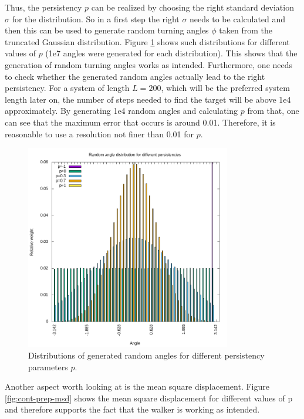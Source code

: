 \documentclass[]{scrartcl}
\begin{document}
Thus, the persistency $p$ can be realized by choosing the right standard deviation $\sigma$ for the distribution. So in a first step the right $\sigma$ needs to be calculated and then this can be used to generate random turning angles $\phi$ taken from the truncated Gaussian distribution. Figure \ref{fig:cont-prep-angleDistribution} shows such distributions for different values of $p$ (1e7 angles were generated for each distribution). This shows that the generation of random turning angles works as intended. Furthermore, one needs to check whether the generated random angles actually lead to the right persistency. For a system of length $L = 200$, which will be the preferred system length later on, the number of steps needed to find the target will be above 1e4 approximately. By generating 1e4 random angles and calculating $p$ from that, one can see that the maximum error that occurs is around 0.01. Therefore, it is reasonable to use a resolution not finer than 0.01 for $p$.

\begin{figure}[!hbt]
 \centering
 \includegraphics[width=0.8\textwidth]{./fig/cont/prep/angleDistribution.png}
 \caption{Distributions of generated random angles for different persistency parameters $p$.}
 \label{fig:cont-prep-angleDistribution}
\end{figure}

Another aspect worth looking at is the mean square displacement. Figure \ref{fig:cont-prep-msd} shows the mean square displacement for different values of p and therefore supports the fact that the walker is working as intended.
\end{document}
